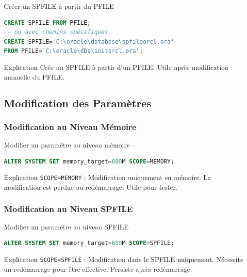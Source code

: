 \documentclass[12pt,a4paper]{article}
\begin{document}
\begin{commande}{Créer un SPFILE à partir du PFILE}
\begin{lstlisting}[language=SQL]
CREATE SPFILE FROM PFILE;
-- ou avec chemins spécifiques
CREATE SPFILE='C:\oracle\database\spfileorcl.ora' 
FROM PFILE='C:\oracle\dbs\initorcl.ora';
\end{lstlisting}
\end{commande}

\begin{explication}{Explication}
Crée un SPFILE à partir d'un PFILE. Utile après modification manuelle du PFILE.
\end{explication}

\subsection{Modification des Paramètres}

\subsubsection{Modification au Niveau Mémoire}

\begin{commande}{Modifier un paramètre au niveau mémoire}
\begin{lstlisting}[language=SQL]
ALTER SYSTEM SET memory_target=600M SCOPE=MEMORY;
\end{lstlisting}
\end{commande}

\begin{explication}{Explication}
\texttt{SCOPE=MEMORY} : Modification uniquement en mémoire. La modification est perdue au redémarrage. Utile pour tester.
\end{explication}

\subsubsection{Modification au Niveau SPFILE}

\begin{commande}{Modifier un paramètre au niveau SPFILE}
\begin{lstlisting}[language=SQL]
ALTER SYSTEM SET memory_target=600M SCOPE=SPFILE;
\end{lstlisting}
\end{commande}

\begin{explication}{Explication}
\texttt{SCOPE=SPFILE} : Modification dans le SPFILE uniquement. Nécessite un redémarrage pour être effective. Persiste après redémarrage.
\end{explication}
\end{document}
